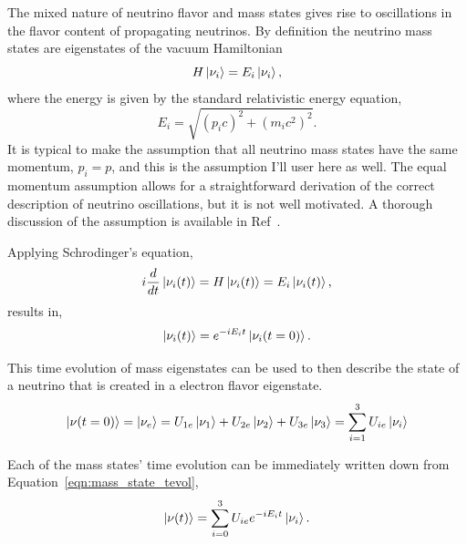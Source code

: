 The mixed nature of neutrino flavor and mass states gives rise to oscillations
in the flavor content of propagating neutrinos.
By definition the neutrino mass states are eigenstates of the vacuum Hamiltonian
\begin{equation}
    H\ket{\nu_{i}} = E_{i}\ket{\nu_{i}}\text{,}
\end{equation}
where the energy is given by the standard relativistic energy equation,
\begin{equation}
    E_{i} = \sqrt{{(p_{i}c)}^{2} + {(m_{i}c^{2})}^2}\text{.}
\end{equation}
It is typical to make the assumption that all neutrino mass states have the same
momentum, $p_{i} = p$, and this is the assumption I'll user here as well.
The equal momentum assumption allows for a straightforward derivation of the
correct description of neutrino oscillations, but it is not well motivated.
A thorough discussion of the assumption is available in Ref~\cite{Ahkmedov_Quantum}.

Applying Schrodinger's equation,
\begin{equation}
    i\frac{d}{dt}\ket{\nu_{i}(t)} = H\ket{\nu_{i}(t)} = E_{i}\ket{\nu_{i}(t)}\text{,}
\end{equation}
results in,
\begin{equation}
    \ket{\nu_{i}(t)} = e^{-iE_{i}t}\ket{\nu_{i}(t=0)}\text{.}
    \label{eqn:mass_state_tevol}
\end{equation}

This time evolution of mass eigenstates can be used to then describe the state
of a neutrino that is created in a electron flavor eigenstate.
\begin{equation}
\ket{\nu(t=0)} = \ket{\nu_{e}} = U_{1e}\ket{\nu_1} + U_{2e}\ket{\nu_{2}} + U_{3e}\ket{\nu_{3}}
    =\sum_{i=1}^{3}U_{ie}\ket{\nu_{i}}
\end{equation}

Each of the mass states' time evolution can be immediately written down from
Equation~\eqref{eqn:mass_state_tevol},
\begin{equation}
    \ket{\nu(t)} = \sum_{i=0}^{3} U_{ie}e^{-iE_{i}t}\ket{\nu_{i}}\text{.}
    \label{eqn:e_state}
\end{equation}

